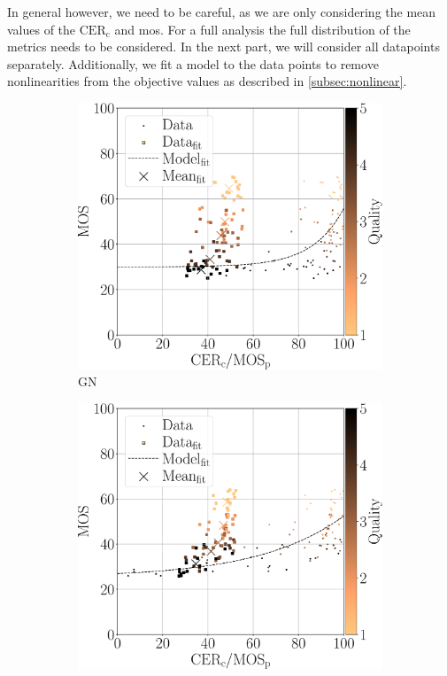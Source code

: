 In general however, we need to be careful, as we are only considering the mean values of the $\text{CER}_{\text{c}}$ and \gls{mos}.
For a full analysis the full distribution of the metrics needs to be considered.
In the next part, we will consider all datapoints separately.
Additionally, we fit a model to the data points to remove nonlinearities from the objective values as described in \autoref{subsec:nonlinear}.




\begin{figure}[h!]
\centering
    \begin{subfigure}[b]{0.32\textwidth}
        \includegraphics[width=\textwidth]{../../images/analyze/mos_cer_ref_fitted_mean_ezocr_GN.pdf}
        \caption{GN}
        \label{fig:mos_cer_ref_fitted_mean_ezocr_GN}
    \end{subfigure}%
    \hfill
    \begin{subfigure}[b]{0.32\textwidth}
        \includegraphics[width=\textwidth]{../../images/analyze/mos_cer_ref_fitted_mean_ezocr_GB.pdf}

\end{subfigure}
\end{figure}
